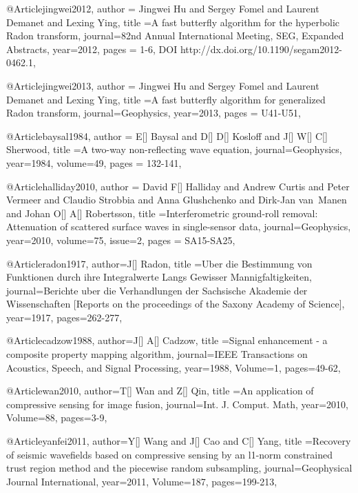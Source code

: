 @Article{jingwei2012,
  author = {Jingwei Hu and Sergey Fomel and Laurent Demanet and Lexing Ying},
  title ={A fast butterfly algorithm for the hyperbolic Radon transform},
  journal={82nd Annual International Meeting, SEG, Expanded Abstracts},
  year=2012,
  pages = {1-6, DOI http://dx.doi.org/10.1190/segam2012-0462.1},
}

@Article{jingwei2013,
  author = {Jingwei Hu and Sergey Fomel and Laurent Demanet and Lexing Ying},
  title ={A fast butterfly algorithm for generalized Radon transform},
  journal={Geophysics},
  year=2013,
  pages = {U41-U51},
}

@Article{baysal1984,
  author = {E[] Baysal and D[] D[] Kosloff and J[] W[] C[] Sherwood},
  title ={A two-way non-reflecting wave equation},
  journal={Geophysics},
  year=1984,
  volume={49},
  pages = {132-141},
}



@Article{halliday2010,
  author = {David F[] Halliday and Andrew Curtis and Peter Vermeer and Claudio Strobbia and Anna Glushchenko and Dirk-Jan van~Manen and Johan O[] A[] Robertsson},
  title ={Interferometric ground-roll removal: Attenuation of scattered surface waves in single-sensor data},
  journal={Geophysics},
  year=2010,
  volume={75},
  issue=2,
  pages = {SA15-SA25},
}


@Article{radon1917,
  author={J[] Radon},
  title ={Uber die Bestimmung von Funktionen durch ihre Integralwerte Langs Gewisser Mannigfaltigkeiten},
  journal={Berichte uber die Verhandlungen der Sachsische Akademie der Wissenschaften [Reports on the proceedings of the Saxony Academy of Science]},
  year=1917,
  pages={262-277},
}

@Article{cadzow1988,
  author={J[] A[] Cadzow},
  title ={Signal enhancement - a composite property mapping algorithm},
  journal={IEEE Transactions on Acoustics, Speech, and Signal Processing},
  year=1988,
  Volume=1,
  pages={49-62},
}

@Article{wan2010,
  author={T[] Wan and Z[] Qin},
  title ={An application of compressive sensing for image fusion},
  journal={Int. J. Comput. Math},
  year=2010,
  Volume=88,
  pages={3-9},
}

@Article{yanfei2011,
  author={Y[] Wang and J[] Cao and C[] Yang},
  title ={Recovery of seismic wavefields based on compressive sensing by an l1-norm constrained trust region method and the piecewise random subsampling},
  journal={Geophysical Journal International},
  year=2011,
  Volume=187,
  pages={199-213},
}

